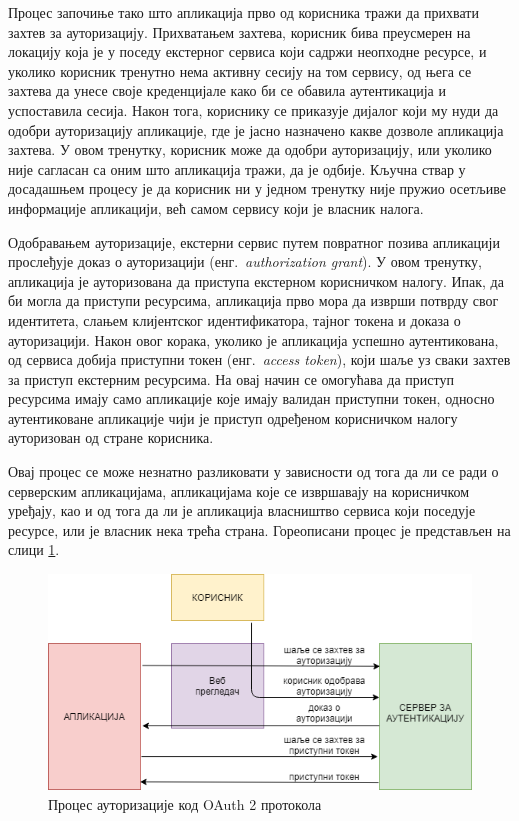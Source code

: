 \documentclass[12pt,oneside]{memoir}
\begin{document}
Процес започиње тако што апликација прво од корисника тражи да прихвати захтев за ауторизацију. Прихватањем захтева, корисник бива преусмерен на локацију која је у поседу екстерног сервиса који садржи неопходне ресурсе, и уколико корисник тренутно нема активну сесију на том сервису, од њега се захтева да унесе своје креденцијале како би се обавила аутентикација и успоставила сесија. Након тога, кориснику се приказује дијалог који му нуди да одобри ауторизацију апликације, где је јасно назначено какве дозволе апликација захтева. У овом тренутку, корисник може да одобри ауторизацију, или уколико није сагласан са оним што апликација тражи, да је одбије. Кључна ствар у досадашњем процесу је да корисник ни у једном тренутку није пружио осетљиве информације апликацији, већ самом сервису који је власник налога.

Одобравањем ауторизације, екстерни сервис путем повратног позива апликацији прослеђује доказ о ауторизацији (енг.~\textit{authorization grant}). У овом тренутку, апликација је ауторизована да приступа екстерном корисничком налогу. Ипак, да би могла да приступи ресурсима, апликација прво мора да изврши потврду свог идентитета, слањем клијентског идентификатора, тајног токена и доказа о ауторизацији. Након овог корака, уколико је апликација успешно аутентикована, од сервиса добија приступни токен (енг.~\textit{access token}), који шаље уз сваки захтев за приступ екстерним ресурсима. На овај начин се омогућава да приступ ресурсима имају само апликације које имају валидан приступни токен, односно аутентиковане апликације чији је приступ одређеном корисничком налогу ауторизован од стране корисника.

Овај процес се може незнатно разликовати у зависности од тога да ли се ради о серверским апликацијама, апликацијама које се извршавају на корисничком уређају, као и од тога да ли је апликација власништво сервиса који поседује ресурсе, или је власник нека трећа страна. Гореописани процес је представљен на слици \ref{fig:oauth2}.

\begin{figure}[!ht]
  \centering
  \includegraphics[scale=0.7]{slike/oauth2.png}
  \caption{Процес ауторизације код OAuth 2 протокола}
  \label{fig:oauth2}
\end{figure}
\end{document}
